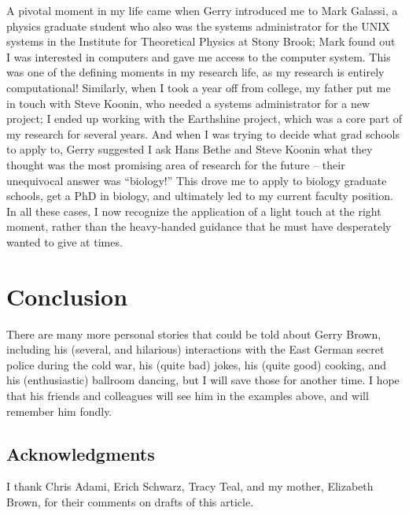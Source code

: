 \documentclass{ws-rv9x6}
\begin{document}
A pivotal moment in my life came when Gerry introduced me to Mark
Galassi, a physics graduate student who also was the systems
administrator for the UNIX systems in the Institute for Theoretical
Physics at Stony Brook; Mark found out I was interested in computers
and gave me access to the computer system. This was one of the
defining moments in my research life, as my research is entirely
computational!  Similarly, when I took a year off from college, my
father put me in touch with Steve Koonin, who needed a systems
administrator for a new project; I ended up working with the
Earthshine project, which was a core part of my research for several
years. And when I was trying to decide what grad schools to apply to,
Gerry suggested I ask Hans Bethe and Steve Koonin what they thought
was the most promising area of research for the future -- their
unequivocal answer was ``biology!''  This drove me to apply to
biology graduate schools, get a PhD in biology, and ultimately led to
my current faculty position. In all these cases, I now recognize the
application of a light touch at the right moment, rather than the
heavy-handed guidance that he must have desperately wanted to give at
times.

\section*{Conclusion}

There are many more personal stories that could be told about Gerry
Brown, including his (several, and hilarious) interactions with the East
German secret police during the cold war, his (quite bad) jokes, his
(quite good) cooking, and his (enthusiastic) ballroom dancing, but I
will save those for another time. I hope that his friends and
colleagues will see him in the examples above, and will remember him
fondly.


\subsection*{Acknowledgments}

I thank Chris Adami, Erich Schwarz, Tracy Teal, and my mother,
Elizabeth Brown, for their comments on drafts of this article.


\end{document}
